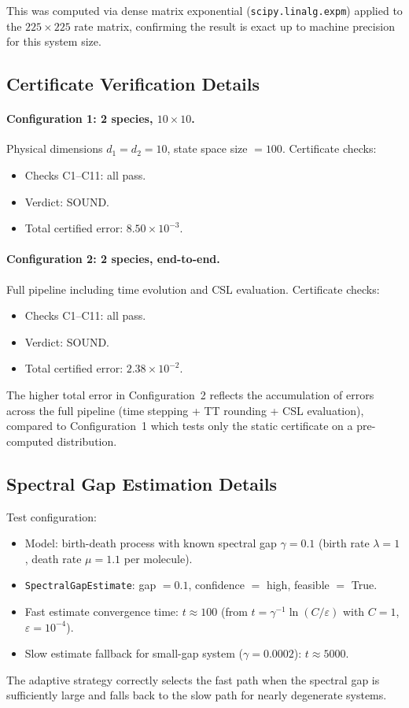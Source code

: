\documentclass[11pt]{article}
\newcommand{\eps}{\varepsilon}
\begin{document}
This was computed via dense matrix exponential
(\texttt{scipy.linalg.expm}) applied to the $225 \times 225$ rate
matrix, confirming the result is exact up to machine precision for
this system size.

\subsection{Certificate Verification Details}

\paragraph{Configuration 1: 2 species, $10 \times 10$.}
Physical dimensions $d_1 = d_2 = 10$, state space size $= 100$.
Certificate checks:
\begin{itemize}[itemsep=1pt]
\item Checks C1--C11: all pass.
\item Verdict: SOUND.
\item Total certified error: $8.50 \times 10^{-3}$.
\end{itemize}

\paragraph{Configuration 2: 2 species, end-to-end.}
Full pipeline including time evolution and CSL evaluation.
Certificate checks:
\begin{itemize}[itemsep=1pt]
\item Checks C1--C11: all pass.
\item Verdict: SOUND.
\item Total certified error: $2.38 \times 10^{-2}$.
\end{itemize}

The higher total error in Configuration~2 reflects the accumulation
of errors across the full pipeline (time stepping + TT rounding +
CSL evaluation), compared to Configuration~1 which tests only the
static certificate on a pre-computed distribution.

\subsection{Spectral Gap Estimation Details}

Test configuration:
\begin{itemize}[itemsep=1pt]
\item Model: birth-death process with known spectral gap $\gamma = 0.1$
  (birth rate $\lambda = 1$, death rate $\mu = 1.1$ per molecule).
\item \texttt{SpectralGapEstimate}: gap $= 0.1$, confidence $=$ high,
  feasible $=$ True.
\item Fast estimate convergence time: $t \approx 100$
  (from $t = \gamma^{-1}\ln(C/\eps)$ with $C=1$, $\eps = 10^{-4}$).
\item Slow estimate fallback for small-gap system ($\gamma = 0.0002$):
  $t \approx 5000$.
\end{itemize}

The adaptive strategy correctly selects the fast path when the
spectral gap is sufficiently large and falls back to the slow
path for nearly degenerate systems.
\end{document}
